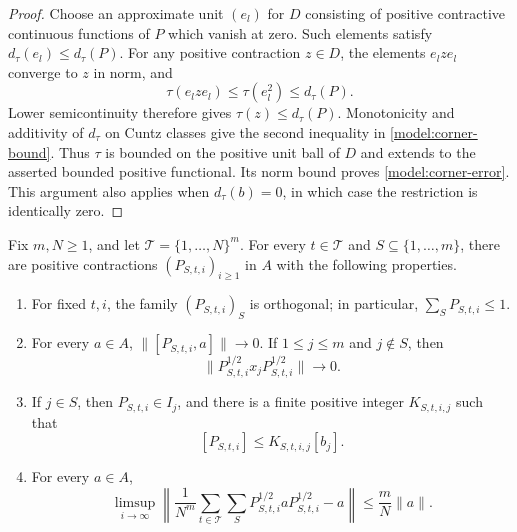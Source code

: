 \begin{proof}
Choose an approximate unit $(e_l)$ for $D$ consisting of positive
contractive continuous functions of $P$ which vanish at zero.  Such
elements satisfy $d_\tau(e_l)\leq d_\tau(P)$.  For any positive
contraction $z\in D$, the elements $e_lze_l$ converge to $z$ in norm,
and
\[
 \tau(e_lze_l)\leq\tau(e_l^2)\leq d_\tau(P).
\]
Lower semicontinuity therefore gives $\tau(z)\leq d_\tau(P)$.
Monotonicity and additivity of $d_\tau$ on Cuntz classes give the
second inequality in \eqref{model:corner-bound}.  Thus $\tau$ is
bounded on the positive unit ball of $D$ and extends to the asserted
bounded positive functional.  Its norm bound proves
\eqref{model:corner-error}.  This argument also applies when
$d_\tau(b)=0$, in which case the restriction is identically zero.
\end{proof}

\begin{lemma}
 \label{model:slicing}
Fix $m,N\geq1$, and let
$\mathcal T=\{1,\ldots,N\}^m$.  For every $t\in\mathcal T$ and
$S\subseteq\{1,\ldots,m\}$, there are positive contractions
$(P_{S,t,i})_{i\geq1}$ in $A$ with the following properties.
\begin{enumerate}
 \item For fixed $t,i$, the family $(P_{S,t,i})_S$ is orthogonal;
 in particular, $\sum_S P_{S,t,i}\leq1$.
 \item For every $a\in A$,
 $\|[P_{S,t,i},a]\|\to0$.  If $1\leq j\leq m$ and $j\notin S$, then
 \[
  \|P_{S,t,i}^{1/2}x_jP_{S,t,i}^{1/2}\|\longrightarrow0.
 \]
 \item If $j\in S$, then $P_{S,t,i}\in I_j$, and there is a finite
 positive integer $K_{S,t,i,j}$ such that
 \begin{equation}
  \label{model:finite-rank-bound}
  [P_{S,t,i}]\leq K_{S,t,i,j}[b_j].
 \end{equation}
 \item For every $a\in A$,
 \begin{equation}
  \label{model:slicing-approximation}
  \limsup_{i\to\infty}
  \left\|\frac1{N^m}\sum_{t\in\mathcal T}\sum_S
     P_{S,t,i}^{1/2}aP_{S,t,i}^{1/2}-a\right\|
  \leq\frac mN\|a\|.
 \end{equation}
\end{enumerate}
\end{lemma}

